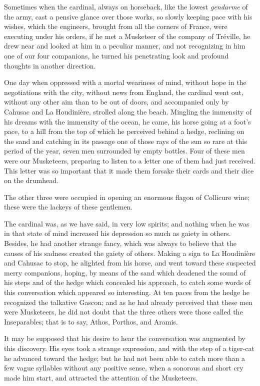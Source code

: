 Sometimes when the cardinal, always on horseback, like the lowest \textit{gendarme} of the army, cast a pensive glance over those works, so slowly keeping pace with his wishes, which the engineers, brought from all the corners of France, were executing under his orders, if he met a Musketeer of the company of Tréville, he drew near and looked at him in a peculiar manner, and not recognizing in him one of our four companions, he turned his penetrating look and profound thoughts in another direction. 

One day when oppressed with a mortal weariness of mind, without hope in the negotiations with the city, without news from England, the cardinal went out, without any other aim than to be out of doors, and accompanied only by Cahusac and La Houdinière, strolled along the beach. Mingling the immensity of his dreams with the immensity of the ocean, he came, his horse going at a foot's pace, to a hill from the top of which he perceived behind a hedge, reclining on the sand and catching in its passage one of those rays of the sun so rare at this period of the year, seven men surrounded by empty bottles. Four of these men were our Musketeers, preparing to listen to a letter one of them had just received. This letter was so important that it made them forsake their cards and their dice on the drumhead. 

The other three were occupied in opening an enormous flagon of Collicure wine; these were the lackeys of these gentlemen. 

The cardinal was, as we have said, in very low spirits; and nothing when he was in that state of mind increased his depression so much as gaiety in others. Besides, he had another strange fancy, which was always to believe that the causes of his sadness created the gaiety of others. Making a sign to La Houdinière and Cahusac to stop, he alighted from his horse, and went toward these suspected merry companions, hoping, by means of the sand which deadened the sound of his steps and of the hedge which concealed his approach, to catch some words of this conversation which appeared so interesting. At ten paces from the hedge he recognized the talkative Gascon; and as he had already perceived that these men were Musketeers, he did not doubt that the three others were those called the Inseparables; that is to say, Athos, Porthos, and Aramis. 

It may be supposed that his desire to hear the conversation was augmented by this discovery. His eyes took a strange expression, and with the step of a tiger-cat he advanced toward the hedge; but he had not been able to catch more than a few vague syllables without any positive sense, when a sonorous and short cry made him start, and attracted the attention of the Musketeers. 

